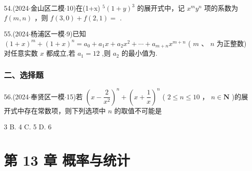 54.(2024$\cdot$金山区二模$\cdot$10)在(1+x) $^{5}{\left( 1 + y\right) }^{3}$ 的展开式中，记 ${x}^{m}{y}^{n}$ 项的系数为 $f\left( {m,n}\right)$ ，则 $f\left( {3,0}\right)  + f\left( {2,1}\right)  =$ \blkda[2]{}.

55.(2024$\cdot$杨浦区一模$\cdot$9)已知 ${\left( 1 + x\right) }^{m} + {\left( 1 + x\right) }^{n} = {a}_{0} + {a}_{1}x + {a}_{2}{x}^{2} + \cdots  + {a}_{m + n}{x}^{m + n}$ ( $m$ 、 $n$ 为正整数) 对任意实数 $x$ 都成立,若 ${a}_{1} = {12}$ ,则 ${a}_{2}$ 的最小值为\blkda[2]{}.

\subsubsection*{二、选择题}

56.(2024$\cdot$奉贤区一模$\cdot$15)若 ${\left( x - \dfrac{2}{{x}^{2}}\right) }^{n} + {\left( x + \dfrac{1}{x}\right) }^{n}$ ( $2 \leq  n \leq  {10}$ ， $n \in  \mathbf{N}$ )的展开式中存在常数项，则下列选项中 $n$ 的取值不可能是 \dotfill{(\kh{})}

\xx{}{}{}{}3 B. 4 C. 5 D. 6

\section*{第 13 章 概率与统计}

